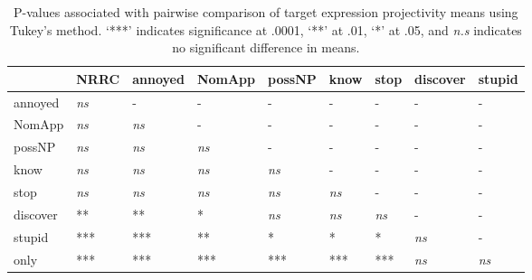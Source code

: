\documentclass[11pt,fleqn]{article}
\newcommand{\6}{\mbox{$[\hspace*{-.6mm}[$}}
\newcommand{\9}{\mbox{$]\hspace*{-.6mm}]$}}
\begin{document}
%

\begin{table}[!h]
\begin{center}
\begin{tabular}{l l l l l l l l l}
\toprule
 &   NRRC & annoyed & NomApp &  possNP &  know & stop & discover & stupid \\
 \midrule
annoyed &  \emph{ns}  &  -  &        -   &       -  &        -  &   - &     -   &  -\\     
NomApp  &  \emph{ns} & \emph{ns} & -    &   -   &    -    &   -  &     -   & - \\    
possNP  &    \emph{ns} & \emph{ns} & \emph{ns} & - &      -  &     -     &  -   & - \\    
know     &   \emph{ns} & \emph{ns} & \emph{ns} & \emph{ns} & -   &    -   &    -       & -\\
stop     &   \emph{ns} & \emph{ns} & \emph{ns} & \emph{ns} & \emph{ns} & - &  - & -\\      
discover  &   ** & ** & * & \emph{ns} & \emph{ns} & \emph{ns} & - & -      \\
stupid    &  *** & *** & ** & * & * & * & \emph{ns} & - \\
only      &  *** & *** & *** & *** & *** & *** & \emph{ns} & \emph{ns} \\
\bottomrule
\end{tabular}

\caption{P-values associated with pairwise comparison of target expression projectivity means using Tukey's method. `***' indicates significance at .0001, `**' at .01, `*' at .05, and \emph{n.s} indicates no significant difference in means.}
\label{tab:pairwise}
\end{center}
\end{table}
\end{document}
